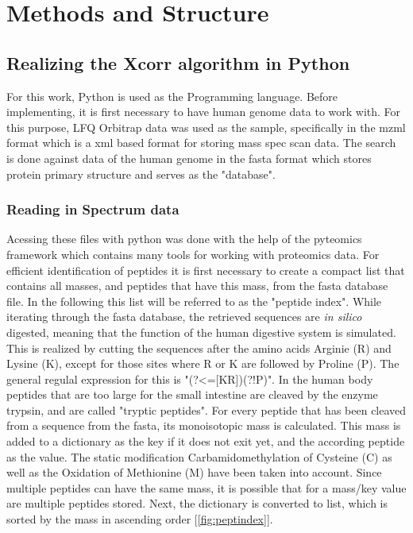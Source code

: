 \documentclass[11pt]{article}
\begin{document}
\section{Methods and Structure}
\subsection{Realizing the Xcorr algorithm in Python}
For this work, Python is used as the Programming language. Before implementing, it is first necessary to have human genome data to work with. For this purpose, LFQ Orbitrap data was used as the sample, specifically in the mzml format which is a xml based format for storing mass spec scan data. The search is done against data of the human genome in the fasta format which stores protein primary structure and serves as the "database".

\subsubsection{Reading in Spectrum data}
Acessing these files with python was done with the help of the pyteomics framework \cite{pyteomics, pyteomics-five-years} which contains many tools for working with proteomics data. For efficient identification of peptides it is first necessary to create a compact list that contains all masses, and peptides that have this mass, from the fasta database file. In the following this list will be referred to as the "peptide index". While iterating through the fasta database, the retrieved sequences are \textit{in silico} digested, meaning that the function of the human digestive system is simulated. This is realized by cutting the sequences after the amino acids Arginie (R) and Lysine (K), except for those sites where R or K are followed by Proline (P). The general regulal expression for this is "(?<=[KR])(?!P)". In the human body peptides that are too large for the small intestine are cleaved by the enzyme trypsin, and are called "tryptic peptides". For every peptide that has been cleaved from a sequence from the fasta, its monoisotopic mass is calculated. This mass is added to a dictionary as the key if it does not exit yet, and the according peptide as the value. The static modification Carbamidomethylation of Cysteine (C) as well as the Oxidation of Methionine (M) have been taken into account. Since multiple peptides can have the same mass, it is possible that for a mass/key value are multiple peptides stored. Next, the dictionary is converted to list, which is sorted by the mass in ascending order [\cref{fig:peptindex}]. 
\end{document}
